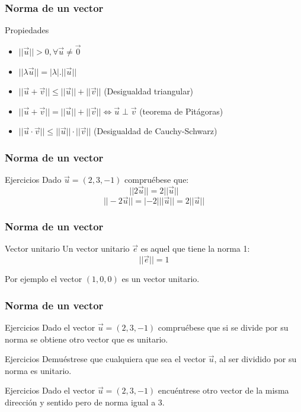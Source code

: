 \documentclass{beamer}
\begin{document}
\begin{frame}
  \frametitle{Norma de un vector}
    \begin{block}{Propiedades}
\begin{itemize}
\item $||\vec u||>0, \forall \vec u \neq \vec 0$
\item $||\lambda \vec u|| = |\lambda|.||\vec u||$
\item $|| \vec u+\vec v|| \leq ||\vec u||+||\vec v||$ (Desigualdad triangular)
\item $|| \vec u+\vec v|| = ||\vec u||+||\vec v||\Leftrightarrow \vec u \perp \vec v$ (teorema de Pit\'agoras)
\item $|| \vec u\cdot\vec v|| \leq ||\vec u||\cdot||\vec v||$ (Desigualdad de Cauchy-Schwarz)
\end{itemize}
\end{block}
\end{frame}

\begin{frame}
  \frametitle{Norma de un vector}
    \begin{block}{Ejercicios}
 Dado $\vec u = (2,3,-1)$ compru\'ebese que: 
 \[||2\vec u|| = 2||\vec u ||\]
 \[||-2\vec u|| = |-2|||\vec u || = 2||\vec u||\]
 \end{block}
\end{frame}

\begin{frame}
  \frametitle{Norma de un vector}
    \begin{block}{Vector unitario}
Un vector unitario $\vec e$ es aquel que tiene la norma 1: \[||\vec e|| = 1\]
 \end{block}
 Por ejemplo el vector $(1,0,0)$ es un vector unitario. 
\end{frame}


\begin{frame}
  \frametitle{Norma de un vector}
    \begin{block}{Ejercicios}
Dado el vector $\vec u = (2,3,-1)$ compru\'ebese que si se divide por su norma se obtiene otro vector que es unitario.
 \end{block}
     \begin{block}{Ejercicios}
Demu\'estrese que cualquiera que sea el vector $\vec u$, al ser dividido por su norma es unitario. 
\end{block}
    \begin{block}{Ejercicios}
Dado el vector $\vec u = (2,3,-1)$ encu\'entrese otro vector de la misma direcci\'on y sentido pero de norma igual a 3.
 \end{block}
 
\end{frame}
\end{document}
